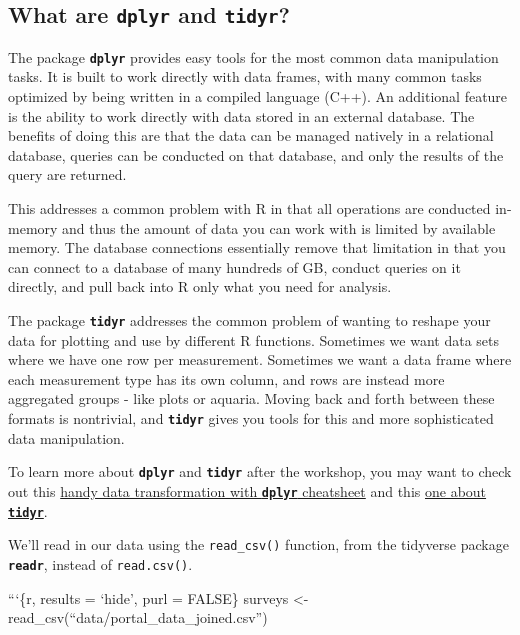 \documentclass[]{article}
\begin{document}
\subsection{\texorpdfstring{What are \textbf{\texttt{dplyr}} and
\textbf{\texttt{tidyr}}?}{What are dplyr and tidyr?}}\label{what-are-dplyr-and-tidyr}

The package \textbf{\texttt{dplyr}} provides easy tools for the most
common data manipulation tasks. It is built to work directly with data
frames, with many common tasks optimized by being written in a compiled
language (C++). An additional feature is the ability to work directly
with data stored in an external database. The benefits of doing this are
that the data can be managed natively in a relational database, queries
can be conducted on that database, and only the results of the query are
returned.

This addresses a common problem with R in that all operations are
conducted in-memory and thus the amount of data you can work with is
limited by available memory. The database connections essentially remove
that limitation in that you can connect to a database of many hundreds
of GB, conduct queries on it directly, and pull back into R only what
you need for analysis.

The package \textbf{\texttt{tidyr}} addresses the common problem of
wanting to reshape your data for plotting and use by different R
functions. Sometimes we want data sets where we have one row per
measurement. Sometimes we want a data frame where each measurement type
has its own column, and rows are instead more aggregated groups - like
plots or aquaria. Moving back and forth between these formats is
nontrivial, and \textbf{\texttt{tidyr}} gives you tools for this and
more sophisticated data manipulation.

To learn more about \textbf{\texttt{dplyr}} and \textbf{\texttt{tidyr}}
after the workshop, you may want to check out this
\href{https://github.com/rstudio/cheatsheets/raw/master/data-transformation.pdf}{handy
data transformation with \textbf{\texttt{dplyr}} cheatsheet} and this
\href{https://github.com/rstudio/cheatsheets/raw/master/data-import.pdf}{one
about \textbf{\texttt{tidyr}}}.

We'll read in our data using the \texttt{read\_csv()} function, from the
tidyverse package \textbf{\texttt{readr}}, instead of
\texttt{read.csv()}.

```\{r, results = `hide', purl = FALSE\} surveys \textless{}-
read\_csv(``data/portal\_data\_joined.csv'')
\end{document}
